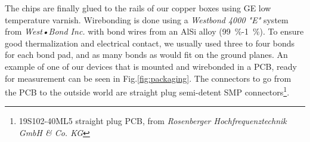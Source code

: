 The chips are finally glued to the rails of our copper boxes using GE low temperature varnish.
Wirebonding is done using a \textit{Westbond 4000 "E"} system from \textit{West•Bond Inc.} with bond wires from an AlSi alloy (\SI{99}{\percent}-\SI{1}{\percent}).
To ensure good thermalization and electrical contact, we usually used three to four bonds for each bond pad, and as many bonds as would fit on the ground planes.
An example of one of our devices that is mounted and wirebonded in a PCB, ready for measurement can be seen in Fig.\ref{fig:packaging}.
The connectors to go from the PCB to the outside world are straight plug semi-detent SMP connectors\footnote{19S102-40ML5 straight plug PCB, from \textit{Rosenberger Hochfrequenztechnik GmbH \& Co. KG}}.




